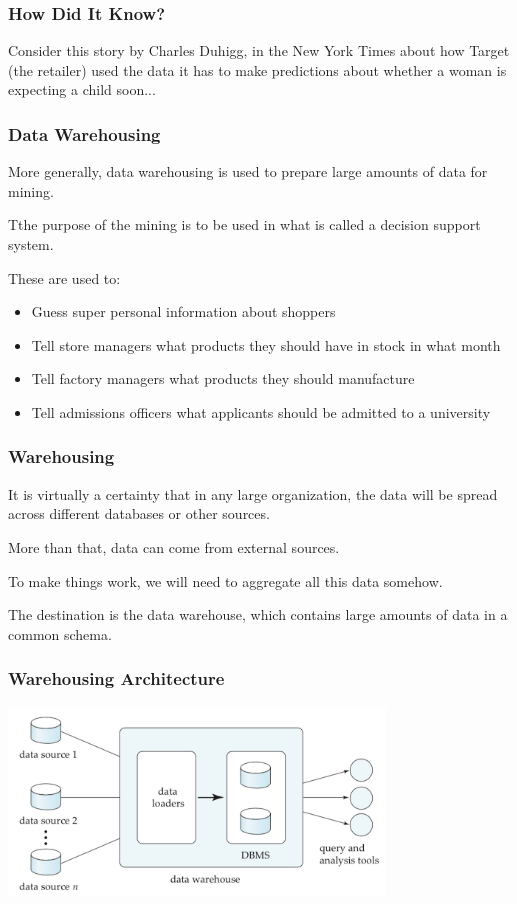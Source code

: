 \begin{frame}
\frametitle{How Did It Know?}

Consider this story by Charles Duhigg, in the New York Times about how Target (the retailer) used the data it has to make predictions about whether a woman is expecting a child soon...

\end{frame}

\begin{frame}
\frametitle{Data Warehousing}

More generally, data warehousing is used to prepare large amounts of data for mining.

Tthe purpose of the mining is to be used in what is called a \alert{decision support system}. 

These are used to:

\begin{itemize}
 \item Guess super personal information about shoppers
 \item Tell store managers what products they should have in stock in what month
 \item Tell factory managers what products they should manufacture
 \item Tell admissions officers what applicants should be admitted to a university
\end{itemize}

\end{frame}


\begin{frame}
\frametitle{Warehousing}

It is virtually a certainty that in any large organization, the data will be spread across different databases or other sources. 

More than that, data can come from external sources.

To make things work, we will need to aggregate all this data somehow. 

The destination is the data warehouse, which contains large amounts of data in a common schema.

\end{frame}

\begin{frame}
\frametitle{Warehousing Architecture}

\begin{center}
\includegraphics[width=0.75\textwidth]{images/warehouse}
\end{center}


\end{frame}

